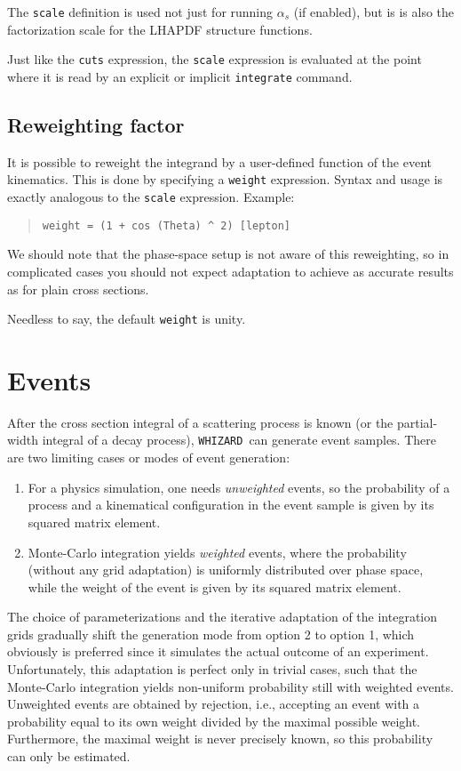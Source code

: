 \documentclass[12pt]{book}
\newcommand{\ttt}[1]{\texttt{#1}}
\newcommand{\whizard}{\texttt{WHIZARD}}
\begin{document}
The \ttt{scale} definition is used not just for running $\alpha_s$ (if
enabled), but is is also the factorization scale for the LHAPDF structure
functions.

Just like the \ttt{cuts} expression, the \ttt{scale} expression is evaluated
at the point where it is read by an explicit or implicit \ttt{integrate}
command.


\subsection{Reweighting factor}

It is possible to reweight the integrand by a user-defined function of the
event kinematics.  This is done by specifying a \ttt{weight} expression.
Syntax and usage is exactly analogous to the \ttt{scale} expression.  Example:
\begin{quote}
\begin{footnotesize}
\begin{verbatim}
weight = (1 + cos (Theta) ^ 2) [lepton]
\end{verbatim}
\end{footnotesize}
\end{quote}
We should note that the phase-space setup is not aware of this reweighting, so
in complicated cases you should not expect adaptation to achieve as accurate
results as for plain cross sections.

Needless to say, the default \ttt{weight} is unity.


\section{Events}

After the cross section integral of a scattering process is known (or the
partial-width integral of a decay process), \whizard\ can generate event
samples.  There are two limiting cases or modes of event generation:
\begin{enumerate}
\item 
  For a physics simulation, one needs \emph{unweighted} events, so the
  probability of a process and a kinematical configuration in the event sample
  is given by its squared matrix element.
\item
  Monte-Carlo integration yields \emph{weighted} events, where the probability
  (without any grid adaptation) is uniformly distributed over phase space,
  while the weight of the event is given by its squared matrix element.
\end{enumerate}
The choice of parameterizations and the iterative adaptation of the
integration grids gradually shift the generation mode from option 2 to option
1, which obviously is preferred since it simulates the actual outcome of an
experiment.  Unfortunately, this adaptation is perfect only in trivial cases,
such that the Monte-Carlo integration yields non-uniform probability still
with weighted events.  Unweighted events are obtained by rejection, i.e.,
accepting an event with a probability equal to its own weight divided by the
maximal possible weight.  Furthermore, the maximal weight is never precisely
known, so this probability can only be estimated.
\end{document}
